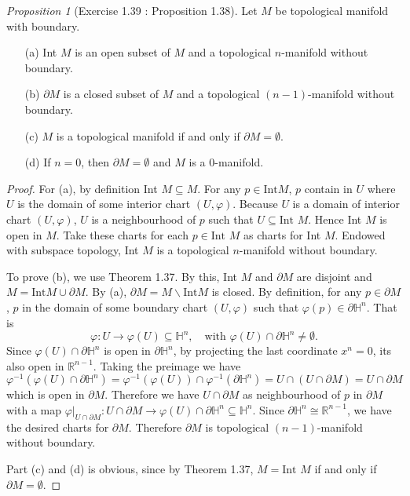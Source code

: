 \documentclass[a4paper]{article}
\theoremstyle{remark}
\newtheorem{prop}{Proposition}
\newcommand{\hn}{\mathbb{H}^n} %
\newcommand{\doo}{\partial}    %
\begin{document}
\begin{prop}[Exercise 1.39 \cite{LeeSM} : Proposition 1.38]
Let $M$ be topological manifold with boundary.
\begin{enumerate}[nolistsep]
\item[(a)] Int $M$ is an open subset of $M$ and a topological $n$-manifold without boundary. 
\item[(b)] $\doo M$ is a closed subset of $M$ and a topological $(n-1)$-manifold without boundary.
\item[(c)] $M$ is a topological manifold if and only if $\doo M = \emptyset$.
\item[(d)] If $n=0$, then $\doo M = \emptyset$ and $M$ is a $0$-manifold.
\end{enumerate}
\end{prop}
\begin{proof}
For (a), by definition Int $M \subseteq M$. For any $p \in \text{Int} M$, $p$ contain in $U$ where $U$ is the domain of some interior chart $(U,\varphi)$. Because $U$ is a domain of interior chart $(U,\varphi)$, $U$ is a neighbourhood of $p$ such that $U \subseteq \text{Int }M$. Hence Int $M$ is open in $M$. Take these charts for each $p \in \text{Int }M$ as charts for Int $M$. Endowed with subspace topology, Int $M$ is a topological $n$-manifold without boundary. 

To prove (b), we use Theorem 1.37. By this, Int $M$ and $\doo M$ are disjoint and $M = \text{Int} M \cup \doo M$. By (a), $\doo M = M \smallsetminus \text{Int} M$ is closed. By definition, for any $p \in \doo M$, $p$ in the domain of some boundary chart $(U,\varphi)$ such that $\varphi(p) \in \doo \hn$. That is
$$
\varphi : U \to \varphi(U) \subseteq \hn,\quad \text{with }\varphi(U) \cap \doo \hn \neq \emptyset.
$$
Since $\varphi(U) \cap \doo \hn$ is open in $\doo \hn$, by projecting the last coordinate $x^n=0$, its also open in $\mathbb{R}^{n-1}$. Taking the preimage we have
$$
\varphi^{-1}(\varphi(U) \cap \doo \hn) = \varphi^{-1} (\varphi(U)) \cap \varphi^{-1}(\doo\hn)= U \cap (U \cap \doo M) = U \cap \doo M
$$
which is open in $\doo M$. Therefore we have $U \cap \doo M$ as neighbourhood of $p$ in $\doo M$ with a map $\varphi|_{U \cap \doo M} : U \cap \doo M \to \varphi(U) \cap \doo \hn \subseteq \hn $. Since $\doo\hn \cong \mathbb{R}^{n-1}$, we have the desired charts for $\doo M$. Therefore $\doo M$ is topological $(n-1)$-manifold without boundary.

Part (c) and (d) is obvious, since by Theorem 1.37, $M=\text{Int }M$ if and only if $\doo M = \emptyset$. 
\end{proof}
\end{document}
